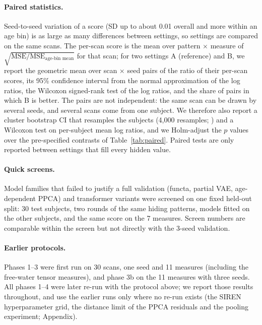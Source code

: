 \documentclass[11pt]{article}
\begin{document}
\paragraph{Paired statistics.} Seed-to-seed variation of a score (SD up to about 0.01 overall and more within an age
bin) is as large as many differences between settings, so settings are compared on the same scans. The per-scan score
is the mean over pattern $\times$ measure of $\sqrt{\mathrm{MSE}/\mathrm{MSE}_{\text{age-bin mean}}}$ for that scan; for
two settings A (reference) and B, we report the geometric mean over scan $\times$ seed pairs of the ratio of their
per-scan scores, its 95\% confidence interval from the normal approximation of the log ratios, the Wilcoxon signed-rank
test \citep{wilcoxon1945} of the log ratios, and the share of pairs in which B is better. The \nPairs{} pairs are not
independent: the same scan can be drawn by several seeds, and several scans come from one subject. We therefore also
report a cluster bootstrap CI that resamples the \nSubjPairs{} subjects (4,000 resamples; \citealp{field2007bootstrap})
and a Wilcoxon test on per-subject mean log ratios, and we Holm-adjust \citep{holm1979} the $p$ values over the
\nContrasts{} pre-specified contrasts of Table~\ref{tab:paired}. Paired tests are only reported between settings that
fill every hidden value.

\paragraph{Quick screens.} Model families that failed to justify a full validation (functa, partial VAE,
age-dependent PPCA) and transformer variants were screened on one fixed held-out split: 30 test subjects, two rounds
of the same hiding patterns, models fitted on the other subjects, and the same score on the 7 measures. Screen numbers
are comparable within the screen but not directly with the 3-seed validation.

\paragraph{Earlier protocols.} Phases 1--3 were first run on 30 scans, one seed and 11 measures (including the
free-water tensor measures), and phase 3b on the 11 measures with three seeds. All phases 1--4 were later re-run with
the protocol above; we report those results throughout, and use the earlier runs only where no re-run exists (the
SIREN hyperparameter grid, the distance limit of the PPCA residuals and the pooling experiment; Appendix).
\end{document}
